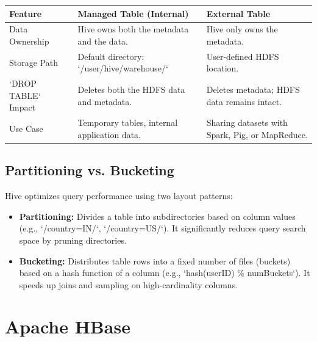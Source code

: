 \documentclass[12pt,a4paper]{article}
\renewcommand{\arraystretch}{1.45}
\begin{document}
\par\vspace{6pt}\noindent
{\renewcommand{\arraystretch}{1.4}%
\begin{tabularx}{\linewidth}{|B{3.2cm}|Y|Y|}
\hline
\textbf{Feature} & \textbf{Managed Table (Internal)} & \textbf{External Table} \\
\hline
Data Ownership & Hive owns both the metadata and the data. & Hive only owns the metadata. \\
\hline
Storage Path & Default directory: `/user/hive/warehouse/` & User-defined HDFS location. \\
\hline
`DROP TABLE` Impact & Deletes both the HDFS data and metadata. & Deletes metadata; HDFS data remains intact. \\
\hline
Use Case & Temporary tables, internal application data. & Sharing datasets with Spark, Pig, or MapReduce. \\
\hline
\end{tabularx}}

\subsection{Partitioning vs. Bucketing}
Hive optimizes query performance using two layout patterns:

\begin{tcolorbox}[formulabox, title={Partitioning vs. Bucketing Properties}]
  \begin{itemize}[leftmargin=*, noitemsep]
    \item \textbf{Partitioning:} Divides a table into subdirectories based on column values (e.g., `/country=IN/`, `/country=US/`). It significantly reduces query search space by pruning directories.
    \item \textbf{Bucketing:} Distributes table rows into a fixed number of files (buckets) based on a hash function of a column (e.g., `hash(userID) \% numBuckets`). It speeds up joins and sampling on high-cardinality columns.
  \end{itemize}
\end{tcolorbox}

\section{Apache HBase}
\end{document}
